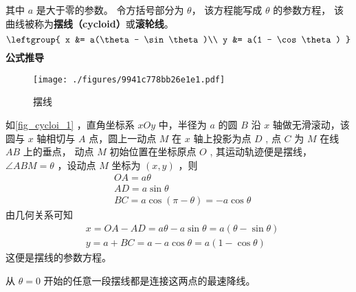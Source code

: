 
\begin{issues}
\issueDraft
\end{issues}

其中 $a$ 是大于零的参数。 令方括号部分为 $\theta$， 该方程能写成 $\theta$ 的参数方程， 该曲线被称为\textbf{摆线（cycloid）}或\textbf{滚轮线}。 %
\begin{equation}
\leftgroup{
x &= a(\theta - \sin\theta)\\
y &= a(1 - \cos\theta)
}\end{equation}
\textbf{公式推导}
\begin{figure}[ht]
\centering
\texttt{[image: ./figures/9941c778bb26e1e1.pdf]}
\caption{摆线} \label{fig_cycloi_1}
\end{figure}
如\autoref{fig_cycloi_1} ，直角坐标系 $xOy$ 中，半径为 $a$ 的圆 $B$ 沿 $x$ 轴做无滑滚动，该圆与 $x$ 轴相切与 $A$ 点，圆上一动点 $M$ 在 $x$ 轴上投影为点 $D$ , 点 $C$ 为 $M$ 在线 $AB$ 上的垂点， 动点 $M$ 初始位置在坐标原点 $O$ , 其运动轨迹便是摆线， $\angle ABM=\theta$ ，设动点 $M$ 坐标为 $(x,y)$ ，则
\begin{equation}
\begin{aligned}
&OA=a\theta \\
&AD=a\sin\theta\\
&BC=a\cos(\pi-\theta)=-a \cos\theta
\end{aligned}
\end{equation}
由几何关系可知
\begin{equation}
\begin{aligned}
&x=OA-AD=a\theta-a\sin\theta=a(\theta-\sin\theta)\\
&y=a+BC=a-a\cos\theta=a(1-\cos\theta)
\end{aligned}
\end{equation}
这便是摆线的参数方程。


从 $\theta = 0$ 开始的任意一段摆线都是连接这两点的最速降线。 

